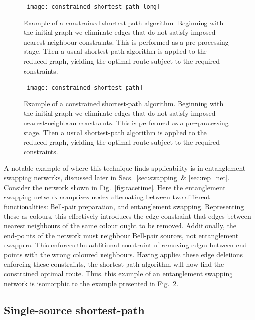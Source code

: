 \pubmode
\begin{figure}[!htbp]
\texttt{[image: constrained\_shortest\_path\_long]}
\caption{Example of a constrained shortest-path algorithm. Beginning with the initial graph we eliminate edges that do not satisfy imposed nearest-neighbour constraints. This is performed as a pre-processing stage. Then a usual shortest-path algorithm is applied to the reduced graph, yielding the optimal route subject to the required constraints.}\label{fig:constrained_shortest_path}
\end{figure}
\else
\begin{figure}[!htbp]
\texttt{[image: constrained\_shortest\_path]}
\caption{Example of a constrained shortest-path algorithm. Beginning with the initial graph we eliminate edges that do not satisfy imposed nearest-neighbour constraints. This is performed as a pre-processing stage. Then a usual shortest-path algorithm is applied to the reduced graph, yielding the optimal route subject to the required constraints.}\label{fig:constrained_shortest_path}
\end{figure}
\fi

A notable example of where this technique finds applicability is in entanglement swapping networks, discussed later in Secs.~\ref{sec:swapping} \& \ref{sec:rep_net}. Consider the network shown in Fig.~\ref{fig:racetime}. Here the entanglement swapping network comprises nodes alternating between two different functionalities: Bell-pair preparation, and entanglement swapping. Representing these as colours, this effectively introduces the edge constraint that edges between nearest neighbours of the same colour ought to be removed. Additionally, the end-points of the network must neighbour Bell-pair sources, not entanglement swappers. This enforces the additional constraint of removing edges between end-points with the wrong coloured neighbours. Having applies these edge deletions enforcing these constraints, the shortest-path algorithm will now find the constrained optimal route. Thus, this example of an entanglement swapping network is isomorphic to the example presented in Fig.~\ref{fig:constrained_shortest_path}.

%
%

\subsection{Single-source shortest-path} \label{sec:single_source_sp} 

